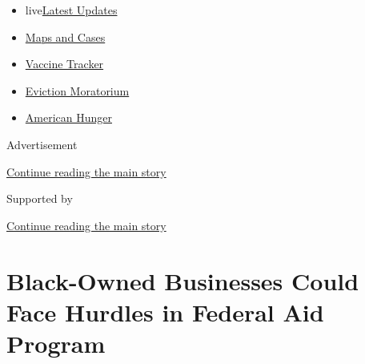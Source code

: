 \begin{itemize}
\tightlist
\item
  live\href{https://www.nytimes3xbfgragh.onion/2020/09/09/world/covid-19-coronavirus.html?name=styln-coronavirus-markets\&region=TOP_BANNER\&block=storyline_menu_recirc\&action=click\&pgtype=Article\&impression_id=49b204f1-f28f-11ea-87c3-11143d5ed90a\&variant=undefined}{Latest
  Updates}
\item
  \href{https://www.nytimes3xbfgragh.onion/interactive/2020/us/coronavirus-us-cases.html?name=styln-coronavirus-markets\&region=TOP_BANNER\&block=storyline_menu_recirc\&action=click\&pgtype=Article\&impression_id=49b22c00-f28f-11ea-87c3-11143d5ed90a\&variant=undefined}{Maps
  and Cases}
\item
  \href{https://www.nytimes3xbfgragh.onion/interactive/2020/science/coronavirus-vaccine-tracker.html?name=styln-coronavirus-markets\&region=TOP_BANNER\&block=storyline_menu_recirc\&action=click\&pgtype=Article\&impression_id=49b22c01-f28f-11ea-87c3-11143d5ed90a\&variant=undefined}{Vaccine
  Tracker}
\item
  \href{https://www.nytimes3xbfgragh.onion/2020/09/02/your-money/eviction-moratorium-covid.html?name=styln-coronavirus-markets\&region=TOP_BANNER\&block=storyline_menu_recirc\&action=click\&pgtype=Article\&impression_id=49b22c02-f28f-11ea-87c3-11143d5ed90a\&variant=undefined}{Eviction
  Moratorium}
\item
  \href{https://www.nytimes3xbfgragh.onion/interactive/2020/09/02/magazine/food-insecurity-hunger-us.html?name=styln-coronavirus-markets\&region=TOP_BANNER\&block=storyline_menu_recirc\&action=click\&pgtype=Article\&impression_id=49b22c03-f28f-11ea-87c3-11143d5ed90a\&variant=undefined}{American
  Hunger}
\end{itemize}

Advertisement

\protect\hyperlink{after-top}{Continue reading the main story}

Supported by

\protect\hyperlink{after-sponsor}{Continue reading the main story}

\hypertarget{black-owned-businesses-could-face-hurdles-in-federal-aid-program}{%
\section{Black-Owned Businesses Could Face Hurdles in Federal Aid
Program}\label{black-owned-businesses-could-face-hurdles-in-federal-aid-program}}

